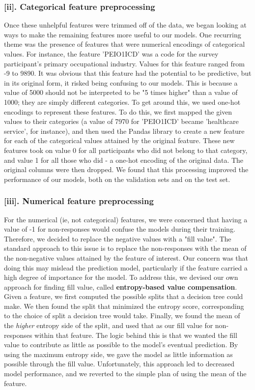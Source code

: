 \subsubsection*{[ii]. Categorical feature preprocessing}
Once these unhelpful features were trimmed off of the data, we began looking at ways to make the remaining features more useful to our models. One recurring theme was the presence of features that were numerical encodings of categorical values. For instance, the feature 'PEIO1ICD' was a code for the survey participant's primary occupational industry. Values for this feature ranged from -9 to 9890. It was obvious that this feature had the potential to be predictive, but in its original form, it risked being confusing to our models. This is because a value of 5000 should not be interpreted to be "5 times higher" than a value of 1000; they are simply different categories. To get around this, we used one-hot encodings to represent these features. To do this, we first mapped the given values to their categories (a value of 7970 for 'PEIO1ICD' became 'healthcare service', for instance), and then used the Pandas library to create a new feature for each of the categorical values attained by the original feature. These new features took on value 0 for all participants who did not belong to that category, and value 1 for all those who did - a one-hot encoding of the original data. The original columns were then dropped. We found that this processing improved the performance of our models, both on the validation sets and on the test set.

\subsubsection*{[iii]. Numerical feature preprocessing}
For the numerical (ie, not categorical) features, we were concerned that having a value of -1 for non-responses would confuse the models during their training. Therefore, we decided to replace the negative values with a "fill value". The standard approach to this issue is to replace the non-responses with the mean of the non-negative values attained by the feature of interest. Our concern was that doing this may mislead the prediction model, particularly if the feature carried a high degree of importance for the model. To address this, we devised our own approach for finding fill value, called \textbf{entropy-based value compensation}. Given a feature, we first computed the possible splits that a decision tree could make. We then found the split that minimized the entropy score, corresponding to the choice of split a decision tree would take. Finally, we found the mean of the \textit{higher} entropy side of the split, and used that as our fill value for non-responses within that feature. The logic behind this is that we wanted the fill value to contribute as little as possible to the model's eventual prediction. By using the maximum entropy side, we gave the model as little information as possible through the fill value. Unfortunately, this approach led to decreased model performance, and we reverted to the simple plan of using the mean of the feature.

